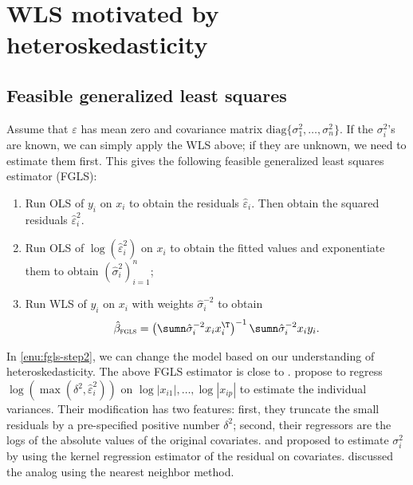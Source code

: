 \section{WLS motivated by heteroskedasticity}


\subsection{Feasible generalized least squares}\label{section::fgls}

Assume that $\varepsilon$ has mean zero and covariance matrix $\text{diag}\{ \sigma_{1}^{2},\ldots,\sigma_{n}^{2} \} $.
If the $\sigma_{i}^{2}$'s are known, we can simply apply the WLS
above; if they are unknown, we need to estimate them first. This gives
the following feasible generalized least squares estimator (FGLS):
\begin{enumerate}[label=(S\arabic*), ref=S\arabic*]
\item Run OLS of $y_i$ on $x_i$ to obtain the residuals $\hat{\varepsilon}_i$. Then obtain the squared residuals $\hat{\varepsilon}_i^2.$

\item \label{enu:fgls-step2}
Run OLS of $\log(\hat{\varepsilon}^{2}_i)$ on
$x_i$ to obtain the fitted values and exponentiate them to obtain $(\hat{\sigma}_{i}^{2})_{i=1}^{n}$;
\item Run WLS of $y_i$ on $x_i$ with weights $ \hat{\sigma}_{i}^{-2} $
to obtain
\[
\hat{\beta}_{\textsc{fgls}}=\left(\sumn\hat{\sigma}_{i}^{-2}x_{i}x_{i}^{\T}\right)^{-1}\sumn\hat{\sigma}_{i}^{-2}x_{i}y_{i}.
\]
\end{enumerate}
%
In \eqref{enu:fgls-step2}, we can change the model based
on our understanding of heteroskedasticity. 
The above FGLS estimator is close to \citet[][Chapter 8]{wooldridge2012introductory}. \citet{romano2017resurrecting} propose to regress $\log ( \max(\delta^2, \hat \varepsilon_i^2) )$ on $ \log | x_{i1} |, \ldots, \log  |x_{ip}|$ to estimate the individual variances. Their modification has two features: first, they truncate the small residuals by a pre-specified positive number $\delta^2$; second, their regressors are the logs of the absolute values of the original covariates. 
\citet{rose1978nonparametric} and \citet{carroll1982adapting} proposed to estimate $\sigma_i^2$ by using the kernel regression estimator of the residual on covariates. 
\citet{robinson1987asymptotically} discussed the analog using the nearest neighbor method.




